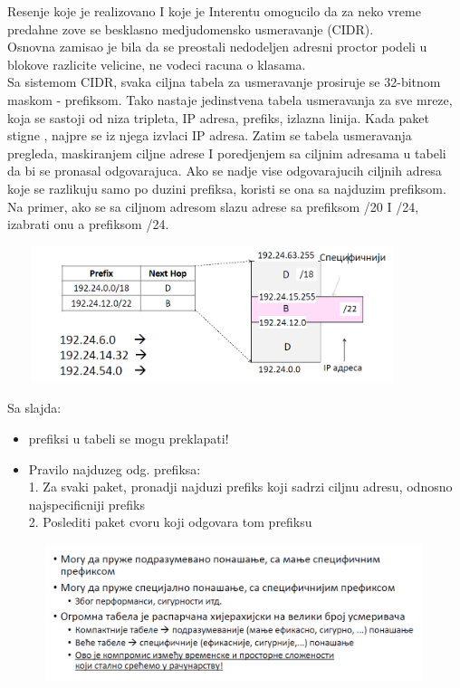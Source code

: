 \documentclass{article} %
\begin{document}
Resenje koje je realizovano I koje je Interentu omogucilo da za neko vreme predahne zove se besklasno medjudomensko usmeravanje (CIDR). \\
Osnovna zamisao je bila da se preostali nedodeljen adresni proctor podeli u blokove razlicite velicine, ne vodeci racuna o klasama.\\
Sa sistemom CIDR, svaka ciljna tabela za usmeravanje prosiruje se 32-bitnom maskom - prefiksom. Tako nastaje jedinstvena tabela usmeravanja za sve mreze, koja se sastoji od niza tripleta, IP adresa, prefiks, izlazna linija. Kada paket stigne , najpre se iz njega izvlaci IP adresa. Zatim se tabela usmeravanja pregleda, maskiranjem ciljne adrese I poredjenjem sa ciljnim adresama u tabeli da bi se pronasal odgovarajuca. Ako se nadje vise odgovarajucih ciljnih adresa koje se razlikuju samo po duzini prefiksa, koristi se ona sa najduzim prefiksom. Na primer, ako se sa ciljnom adresom slazu adrese sa prefiksom /20 I /24, izabrati onu a prefiksom /24. 
 \begin{center}
\includegraphics[width=12cm, height=4cm]{najduziPrefiks}\\
\end{center}
Sa slajda:
\begin{itemize}
  \item prefiksi u tabeli se mogu preklapati!
\item Pravilo najduzeg odg. prefiksa:\\
1. Za svaki paket, pronadji najduzi prefiks koji sadrzi ciljnu adresu, odnosno najspecificniji prefiks\\
2. Poslediti paket cvoru koji odgovara tom prefiksu 
   \begin{center}
\includegraphics[width=12cm, height=4cm]{najduziPrefiks1}\\
\end{center}

\end{itemize}
\end{document}
